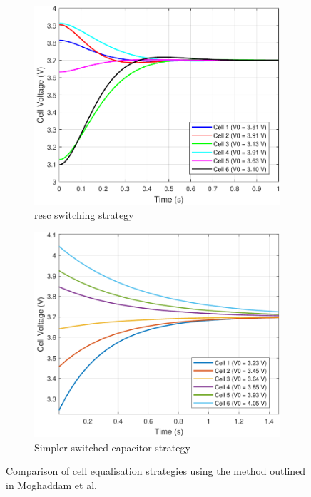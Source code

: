 \begin{figure}[H]
    \centering
    \vspace{5mm}
    \begin{subfigure}[b]{0.4\textwidth} %
        \centering
        \includegraphics[width=\textwidth]{figs/Samuel/Figures/cellV-cropped.pdf}
        \caption{\gls{resc} switching strategy}
        \label{fig:resccrop}
    \end{subfigure}
    \hspace{0.07\textwidth}
    \begin{subfigure}[b]{0.388\textwidth} %
        \centering
        \includegraphics[width=\textwidth]{figs/Samuel/Figures/recpdf-cropped.pdf}
        \caption{Simpler switched-capacitor strategy}
        \label{fig:reccrop}
    \end{subfigure}
    \caption{Comparison of cell equalisation strategies using the method outlined in Moghaddam et al. \cite{8467638}}
    \label{fig:rescvrec}
\end{figure}

